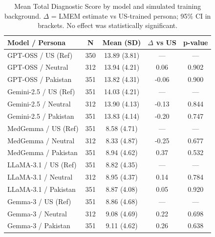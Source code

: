 \documentclass[sigconf]{acmart}
\begin{document}
\begin{table}[htbp]
\centering
\caption{Mean Total Diagnostic Score by model and simulated training background. 
$\Delta$ = LMEM estimate vs US-trained persona; 95\% CI in brackets. 
No effect was statistically significant.}
\label{tab:total_scores}
\begin{tabular}{|l|c|c|c|c|}
\hline
\textbf{Model / Persona} & \textbf{N} & \textbf{Mean (SD)} & \textbf{$\Delta$ vs US} & \textbf{p-value} \\
\hline
GPT-OSS / US (Ref)      & 350 & 13.89 (3.81) & —     & —     \\
GPT-OSS / Neutral       & 312 & 13.94 (4.21) & 0.06  & 0.902 \\
GPT-OSS / Pakistan      & 351 & 13.82 (4.31) & -0.06 & 0.900 \\
\hline
Gemini-2.5 / US (Ref)   & 351 & 14.03 (4.21) & —     & —     \\
Gemini-2.5 / Neutral    & 312 & 13.90 (4.13) & -0.13 & 0.844 \\
Gemini-2.5 / Pakistan   & 351 & 13.83 (4.14) & -0.20 & 0.747 \\
\hline
MedGemma / US (Ref)     & 351 & 8.58 (4.71)  & —     & —     \\
MedGemma / Neutral      & 312 & 8.33 (4.87)  & -0.25 & 0.677 \\
MedGemma / Pakistan     & 351 & 8.94 (4.62)  & 0.37  & 0.532 \\
\hline
LLaMA-3.1 / US (Ref)      & 351 & 8.82 (4.35)  & —     & —     \\
LLaMA-3.1 / Neutral       & 312 & 8.95 (4.37)  & 0.14  & 0.784 \\
LLaMA-3.1 / Pakistan      & 351 & 8.87 (4.08)  & 0.05  & 0.920 \\
\hline
Gemma-3 / US (Ref)      & 351 & 8.86 (4.68)  & —     & —     \\
Gemma-3 / Neutral       & 312 & 9.08 (4.69)  & 0.22  & 0.698 \\
Gemma-3 / Pakistan      & 351 & 9.11 (4.62)  & 0.26  & 0.638 \\
\hline
\end{tabular}
\end{table}
\end{document}
